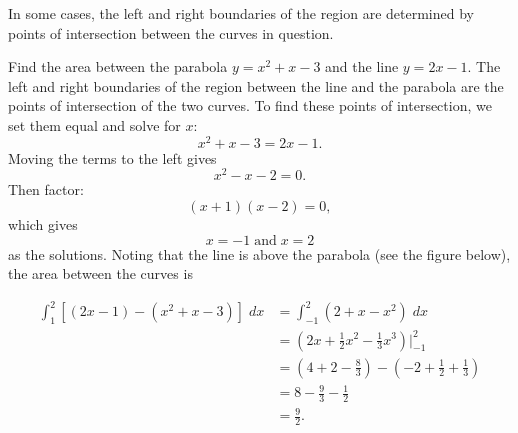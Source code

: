 \documentclass{ximera}
\begin{document}
In some cases, the left and right boundaries of the region are determined by points of intersection between the curves in question.

\begin{example}
Find the area between the parabola $y = x^2 + x - 3$ and the line $y = 2x - 1$. The left and right boundaries of the region between the line and the parabola are 
the points of intersection of the two curves. To find these points of intersection, we set them equal and solve for $x$:
\[
x^2 + x - 3 = 2x-1.
\]
Moving the terms to the left gives
\[
 x^2 -x -2 = 0.
 \]
 Then factor:
 \[
  (x+1)(x-2) = 0,
  \]
  which gives
  \[
   x = -1 \;\text{and}\; x= 2
   \]
   as the solutions.
Noting that the line is above the parabola (see the figure below), the area between the curves is 

\begin{align*}
\int_1^2 \left[(2x - 1) - (x^2 + x - 3)\right] \; dx &= \int_{-1}^2 \left(2 + x - x^2\right) \; dx \\
                                           &= \left(2x + \frac12 x^2 - \frac13 x^3 \right) \bigg|_{-1}^2 \\
                                           &= \left(4 + 2 - \frac83 \right) - \left(-2 + \frac12 + \frac13 \right)\\
                                           &= 8 - \frac93 - \frac12 \\
                                           & = \frac{9}{2}.
\end{align*}

\begin{center}
\end{center}
\end{example}
\end{document}
